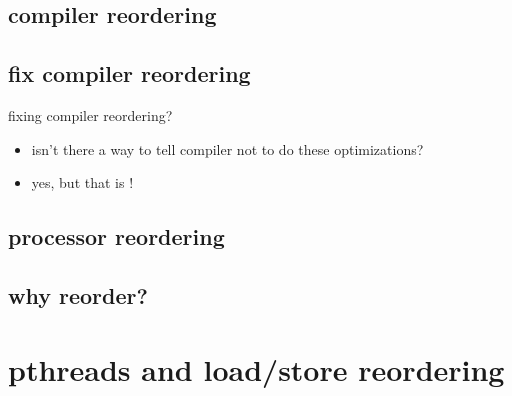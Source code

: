 \subsection{compiler reordering}


\subsection{fix compiler reordering}
\begin{frame}{fixing compiler reordering?}
    \begin{itemize}
    \item isn't there a way to tell compiler not to do these optimizations?
    \item yes, but that is !
    \end{itemize}
\end{frame}

\subsection{processor reordering}


\subsection{why reorder?}





\section{pthreads and load/store reordering}


